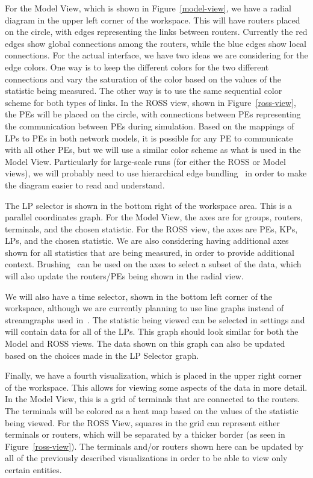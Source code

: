 \documentclass{acm_proc_article-sp}
\begin{document}
For the Model View, which is shown in Figure~\ref{model-view}, we have a radial diagram in the upper left corner of the workspace.  This will have routers placed on the circle, with edges representing the links between routers.  Currently the red edges show global connections among the routers, while the blue edges show local connections.  For the actual interface, we have two ideas we are considering for the edge colors.  One way is to keep the different colors for the two different connections and vary the saturation of the color based on the values of the statistic being measured.  The other way is to use the same sequential color scheme for both types of links.  In the ROSS view, shown in Figure~\ref{ross-view}, the PEs will be placed on the circle, with connections between PEs representing the communication between PEs during simulation.  Based on the mappings of LPs to PEs in both network models, it is possible for any PE to communicate with all other PEs, but we will use a similar color scheme as what is used in the Model View.  Particularly for large-scale runs (for either the ROSS or Model views), we will probably need to use hierarchical edge bundling~\cite{jia} in order to make the diagram easier to read and understand.  

The LP selector is shown in the bottom right of the workspace area.  This is a parallel coordinates graph.  For the Model View, the axes are for groups, routers, terminals, and the chosen statistic.  For the ROSS view, the axes are PEs, KPs, LPs, and the chosen statistic.  We are also considering having additional axes shown for all statistics that are being measured, in order to provide additional context.  Brushing~\cite{hauser} can be used on the axes to select a subset of the data, which will also update the routers/PEs being shown in the radial view.  

We will also have a time selector, shown in the bottom left corner of the workspace, although we are currently planning to use line graphs instead of streamgraphs used in~\cite{cheng}.  The statistic being viewed can be selected in settings and will contain data for all of the LPs.  This graph should look similar for both the Model and ROSS views.  The data shown on this graph can also be updated based on the choices made in the LP Selector graph.  

Finally, we have a fourth visualization, which is placed in the upper right corner of the workspace.  This allows for viewing some aspects of the data in more detail.  In the Model View, this is a grid of terminals that are connected to the routers.  The terminals will be colored as a heat map based on the values of the statistic being viewed.  For the ROSS View, squares in the grid can represent either terminals or routers, which will be separated by a thicker border (as seen in Figure~\ref{ross-view}).  The terminals and/or routers shown here can be updated by all of the previously described visualizations in order to be able to view only certain entities.  
\end{document}
